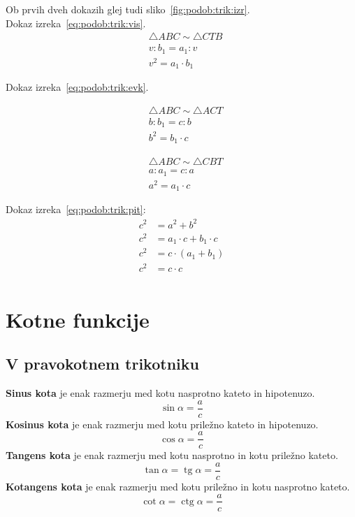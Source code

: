 \documentclass[a4paper,oneside,12pt,fleqn]{article}
\newcommand\krat\cdot
\newcommand{\tg}{\ensuremath{\operatorname{tg}}} %
\newcommand{\ctg}{\ensuremath{\operatorname{ctg}}} %
\numberwithin{equation}{section}
\begin{document}
Ob prvih dveh dokazih glej tudi sliko~\ref{fig:podob:trik:izr}.\\
Dokaz izreka~\eqref{eq:podob:trik:vis}.
\begin{align*}
  &\triangle ABC \sim \triangle CTB \\
  & v : b_1 = a_1 : v \\
  & v^2 = a_1\krat b_1
\end{align*}

Dokaz izreka~\eqref{eq:podob:trik:evk}.\\[-16pt]
\parbox[t]{0.5\textwidth}{
\begin{align*}
  &\triangle ABC \sim \triangle ACT \\
  & b : b_1 = c : b \\
  & b^2 = b_1\krat c
\end{align*}
}
\parbox[t]{0.5\textwidth}{
\begin{align*}
  &\triangle ABC \sim \triangle CBT \\
  & a : a_1 = c : a \\
  & a^2 = a_1\krat c
\end{align*}
}

Dokaz izreka~\eqref{eq:podob:trik:pit}:
\begin{align*}
  c^2 &= a^2 + b^2 \\
  c^2 &= a_1 \krat c + b_1 \krat c \\
  c^2 &= c \krat (a_1 + b_1) \\
  c^2 &= c \krat c \\
\end{align*}



\section{Kotne funkcije}
\label{sec:kot}

\subsection{V pravokotnem trikotniku}
\label{sec:kot:prav}
\textbf{Sinus kota} je enak razmerju med kotu nasprotno kateto in hipotenuzo.
\[ \sin\alpha = \frac{a}{c} \]
\textbf{Kosinus kota} je enak razmerju med kotu priležno kateto in hipotenuzo.
\[ \cos\alpha = \frac{a}{c} \]
\textbf{Tangens kota} je enak razmerju med kotu nasprotno in kotu priležno kateto.
\[ \tan\alpha = \tg\alpha = \frac{a}{c} \]
\textbf{Kotangens kota} je enak razmerju med kotu priležno in kotu nasprotno kateto.
\[ \cot\alpha = \ctg\alpha = \frac{a}{c} \]
\end{document}
